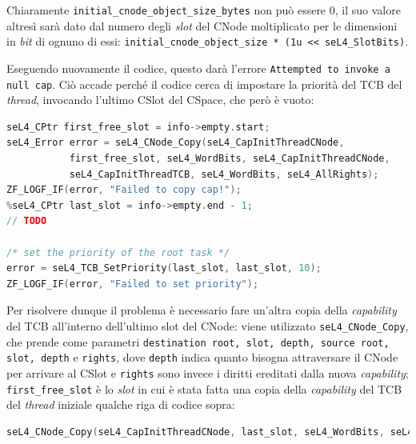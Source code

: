 Chiaramente \texttt{initial\_cnode\_object\_size\_bytes} non può essere 0, il suo valore altresì sarà dato dal numero degli \textit{slot} del CNode moltiplicato per le dimensioni in \textit{bit} di ognuno di essi: \texttt{initial\_cnode\_object\_size * (1u << seL4\_SlotBits)}.

Eseguendo nuovamente il codice, questo darà l'errore \texttt{Attempted to invoke a null cap}. Ciò accade perché il codice cerca di impostare la priorità del TCB del \textit{thread}, invocando l'ultimo CSlot del CSpace, che però è vuoto:
\begin{lstlisting}[language=C++]
seL4_CPtr first_free_slot = info->empty.start;
seL4_Error error = seL4_CNode_Copy(seL4_CapInitThreadCNode, 
           first_free_slot, seL4_WordBits, seL4_CapInitThreadCNode,
           seL4_CapInitThreadTCB, seL4_WordBits, seL4_AllRights);
ZF_LOGF_IF(error, "Failed to copy cap!");
%seL4_CPtr last_slot = info->empty.end - 1;
// TODO

/* set the priority of the root task */
error = seL4_TCB_SetPriority(last_slot, last_slot, 10);
ZF_LOGF_IF(error, "Failed to set priority");
\end{lstlisting}

Per risolvere dunque il problema è necessario fare un'altra copia della \textit{capability} del TCB all'interno dell'ultimo slot del CNode: viene utilizzato \texttt{seL4\_CNode\_Copy}, che prende come parametri \texttt{destination root, slot, depth, source root, slot, depth} e \texttt{rights}, dove \texttt{depth} indica quanto bisogna attraversare il CNode per arrivare al CSlot e \texttt{rights} sono invece i diritti ereditati dalla nuova \textit{capability}; \texttt{first\_free\_slot} è lo \textit{slot} in cui è stata fatta una copia della \textit{capability} del TCB del \textit{thread} iniziale qualche riga di codice sopra:
\begin{lstlisting}[language=C++]
seL4_CNode_Copy(seL4_CapInitThreadCNode, last_slot, seL4_WordBits, seL4_CapInitThreadCNode, first_free_slot, seL4_WordBits, seL4_AllRights);
\end{lstlisting}

